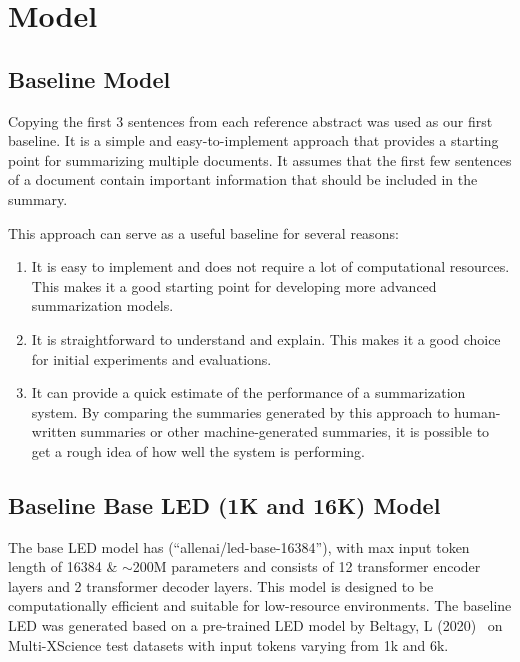 \documentclass[12pt, twocolumn]{article}
\numberwithin{equation}{section}
\begin{document}
\section{Model}
\label{app:model}

\subsection{Baseline Model}
\label{app:model-baseline}

Copying the first 3 sentences from each reference abstract was used as our first baseline. It is a simple and easy-to-implement approach that provides a starting point for summarizing multiple documents. It assumes that the first few sentences of a document contain important information that should be included in the summary.

This approach can serve as a useful baseline for several reasons:

\begin{enumerate}
    \item It is easy to implement and does not require a lot of computational resources. This makes it a good starting point for developing more advanced summarization models.
    \item It is straightforward to understand and explain. This makes it a good choice for initial experiments and evaluations.
    \item It can provide a quick estimate of the performance of a summarization system. By comparing the summaries generated by this approach to human-written summaries or other machine-generated summaries, it is possible to get a rough idea of how well the system is performing.
\end{enumerate}

\subsection{Baseline Base LED (1K and 16K) Model}
\label{app:model-base-led}

The base LED model has (``allenai/led-base-16384''), with max input token length of 16384 \& $\sim$200M parameters and consists of 12 transformer encoder layers and 2 transformer decoder layers. This model is designed to be computationally efficient and suitable for low-resource environments. The baseline LED was generated based on a pre-trained LED model by Beltagy, L (2020)~\cite{beltagy2020longformer} on Multi-XScience test datasets with input tokens varying from 1k and 6k. 
\end{document}
